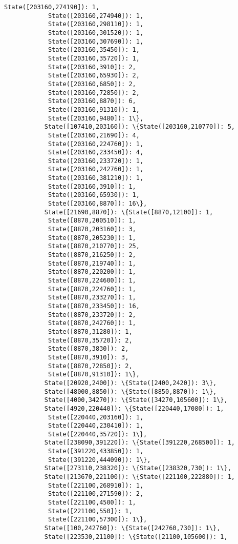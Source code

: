 \documentclass[11pt]{article}
\begin{document}
\begin{Verbatim}[commandchars=\\\{\}]
            State([203160,274190]): 1,
            State([203160,274940]): 1,
            State([203160,298110]): 1,
            State([203160,301520]): 1,
            State([203160,307690]): 1,
            State([203160,35450]): 1,
            State([203160,35720]): 1,
            State([203160,3910]): 2,
            State([203160,65930]): 2,
            State([203160,6850]): 2,
            State([203160,72850]): 2,
            State([203160,8870]): 6,
            State([203160,91310]): 1,
            State([203160,9480]): 1\},
           State([107410,203160]): \{State([203160,210770]): 5,
            State([203160,21690]): 4,
            State([203160,224760]): 1,
            State([203160,233450]): 4,
            State([203160,233720]): 1,
            State([203160,242760]): 1,
            State([203160,381210]): 1,
            State([203160,3910]): 1,
            State([203160,65930]): 1,
            State([203160,8870]): 16\},
           State([21690,8870]): \{State([8870,12100]): 1,
            State([8870,200510]): 1,
            State([8870,203160]): 3,
            State([8870,205230]): 1,
            State([8870,210770]): 25,
            State([8870,216250]): 2,
            State([8870,219740]): 1,
            State([8870,220200]): 1,
            State([8870,224600]): 1,
            State([8870,224760]): 1,
            State([8870,233270]): 1,
            State([8870,233450]): 16,
            State([8870,233720]): 2,
            State([8870,242760]): 1,
            State([8870,31280]): 1,
            State([8870,35720]): 2,
            State([8870,3830]): 2,
            State([8870,3910]): 3,
            State([8870,72850]): 2,
            State([8870,91310]): 1\},
           State([20920,2400]): \{State([2400,2420]): 3\},
           State([48000,8850]): \{State([8850,8870]): 1\},
           State([4000,34270]): \{State([34270,105600]): 1\},
           State([4920,220440]): \{State([220440,17080]): 1,
            State([220440,203160]): 1,
            State([220440,230410]): 1,
            State([220440,35720]): 1\},
           State([238090,391220]): \{State([391220,268500]): 1,
            State([391220,433850]): 1,
            State([391220,444090]): 1\},
           State([273110,238320]): \{State([238320,730]): 1\},
           State([213670,221100]): \{State([221100,222880]): 1,
            State([221100,268910]): 1,
            State([221100,271590]): 2,
            State([221100,4500]): 1,
            State([221100,550]): 1,
            State([221100,57300]): 1\},
           State([100,242760]): \{State([242760,730]): 1\},
           State([223530,21100]): \{State([21100,105600]): 1,

\end{Verbatim}
\end{document}
